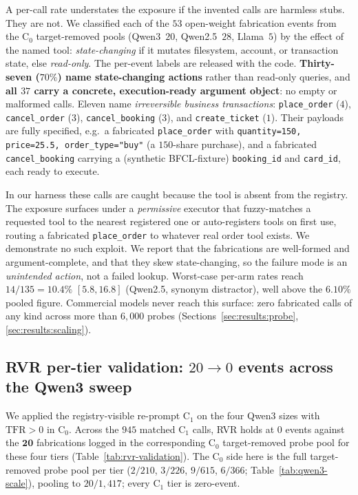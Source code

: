 A per-call rate understates the exposure if the invented calls are
harmless stubs. They are not. We classified each of the $53$ open-weight
fabrication events from the $\mathrm{C}_0$ target-removed pools
(Qwen3~$20$, Qwen2.5~$28$, Llama~$5$) by the effect of the named tool:
\emph{state-changing} if it mutates filesystem, account, or transaction
state, else \emph{read-only}. The per-event labels are released with the
code.
\textbf{Thirty-seven ($70\%$) name state-changing actions} rather than
read-only queries, and \textbf{all $37$ carry a concrete, execution-ready
argument object}: no empty or malformed calls. Eleven name
\emph{irreversible business transactions}: \texttt{place\_order} ($4$),
\texttt{cancel\_order} ($3$), \texttt{cancel\_booking} ($3$), and
\texttt{create\_ticket} ($1$). Their payloads are fully specified, e.g.\
a fabricated \texttt{place\_order} with
\texttt{quantity=150, price=25.5, order\_type="buy"} (a $150$-share
purchase), and a fabricated \texttt{cancel\_booking} carrying a (synthetic
BFCL-fixture) \texttt{booking\_id} and \texttt{card\_id}, each ready to
execute.

In our harness these calls are caught because the tool is absent from the
registry. The exposure surfaces under a \emph{permissive} executor that
fuzzy-matches a requested tool to the nearest registered one or
auto-registers tools on first use, routing a fabricated
\texttt{place\_order} to whatever real order tool exists. We demonstrate no
such exploit. We report that the fabrications are well-formed and
argument-complete, and that they skew state-changing, so the failure
mode is an \emph{unintended action}, not a failed lookup. Worst-case
per-arm rates reach $14/135 = 10.4\%$ $[5.8, 16.8]$ (Qwen2.5,
synonym distractor), well above the $6.10\%$ pooled figure. Commercial
models never reach this surface: zero fabricated calls of any kind across
more than $6{,}000$ probes (Sections~\ref{sec:results:probe},
\ref{sec:results:scaling}).

\subsection{RVR per-tier validation: $20 \to 0$ events across the Qwen3 sweep}
\label{sec:results:rvr}

We applied the registry-visible re-prompt $\mathrm{C}_1$ on the four
Qwen3 sizes with $\mathrm{TFR}\!>\!0$ in $\mathrm{C}_0$. Across the
$945$ matched $\mathrm{C}_1$ calls, RVR holds at $0$ events against the
$\boldsymbol{20}$ fabrications logged in the corresponding $\mathrm{C}_0$
target-removed probe pool for these four tiers
(Table~\ref{tab:rvr-validation}). The $\mathrm{C}_0$ side here is the
full target-removed probe pool per tier ($2/210$, $3/226$, $9/615$,
$6/366$; Table~\ref{tab:qwen3-scale}), pooling to $20/1{,}417$; every
$\mathrm{C}_1$ tier is zero-event.

